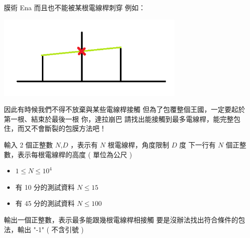 \begin{problem}{膜術 Ena}
而且也不能被某根電線桿刺穿\newline
例如：\newline

\centerline{\includegraphics[width=25em]{./pics/D-3.png}}

因此有時候我們不得不放棄與某些電線桿接觸\newline
但為了包覆整個王國，一定要起於第一根、結束於最後一根\newline
\newline
\newline
你，達拉崩巴\newline
請找出能接觸到最多電線桿，能完整包住，而又不會斷裂的包膜方法吧！\newline


\InputFile

輸入 2 個正整數 $N$,$D$ ，表示有 $N$ 根電線桿，角度限制 $D$ 度 \newline
下一行有 $N$ 個正整數，表示每根電線桿的高度 ( 單位為公尺 ) \newline

\begin{iofmt}
\begin{itemize}
	\item $1 \leq N \leq 10^4$
	\item 有 10 分的測試資料 $N \leq 15$
	\item 有 45 分的測試資料 $N \leq 100$
\end{itemize}
\end{iofmt}

\OutputFile

輸出一個正整數，表示最多能跟幾根電線桿相接觸\newline
要是沒辦法找出符合條件的包法，輸出 "-1" ( 不含引號 )\newline

\Examples

\begin{example}
\end{example}

\end{problem}
